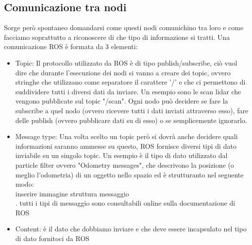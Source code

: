 \subsection{Comunicazione tra nodi}
Sorge però spontaneo domandarsi come questi nodi comunichino tra loro e come facciamo soprattutto a riconoscere di che tipo di informazione si tratti.
Una comunicazione ROS è formata da 3 elementi:
\begin{itemize}
  \item Topic: Il protocollo utilizzato da ROS è di tipo publish/subscribe, ciò vuol dire che durante l'esecuzione dei nodi si vanno a creare dei topic, ovvero stringhe che utilizzano come separatore il carattere '/' e che ci permettono di suddividere tutti i diversi dati da inviare. Un esempio sono le scan lidar che vengono pubblicate sul topic "/scan". Ogni nodo può decidere se fare la subscribe a quel nodo (ovvero ricevere tutti i dati inviati attraverso esso), fare delle publish (ovvero pubblicare dati su di esso) o se semplicemente ignorarlo.
  \item Message type: Una volta scelto un topic però si dovrà anche decidere quali informazioni saranno ammesse su questo, ROS fornisce diversi tipi di dato inviabile su un singolo topic. Un esempio è il tipo di dato utilizzato dal particle filter ovvero "Odometry messages", che descrivono la posizione (o meglio l'odometria) di un oggetto nello spazio ed è strutturanto nel seguente modo: \\ \huge{inserire immagine struttura messaggio} \\. tutti i tipi di messaggio sono consultabili online sulla documentazione di ROS 
  \item Content: è il dato che dobbiamo inviare e che deve essere incapsulato nel tipo di dato fornitoci da ROS
\end{itemize}
